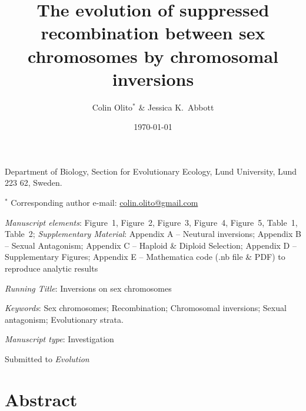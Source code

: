 \documentclass{article}[12pt]
\title{The evolution of suppressed recombination between sex chromosomes by chromosomal inversions}
\author{Colin Olito$^{\ast}$ \& Jessica K.~Abbott}
\date{}
\begin{document}
\maketitle

\noindent{} Department of Biology, Section for Evolutionary Ecology, Lund University, Lund 223 62, Sweden.

\noindent{} $^{\ast}$ Corresponding author e-mail: \url{colin.olito@gmail.com}

\bigskip

\noindent{} \textit{Manuscript elements}: Figure~1, Figure~2, Figure~3, Figure~4, Figure~5, Table~1, Table~2; {\itshape Supplementary Material}: Appendix A -- Neutural inversions; Appendix B -- Sexual Antagonism; Appendix C -- Haploid \& Diploid Selection; Appendix D -- Supplementary Figures; Appendix E -- Mathematica code (.nb file \& PDF) to reproduce analytic results

\bigskip
\noindent{} \textit{Running Title}: Inversions on sex chromosomes

\bigskip

\noindent{} \textit{Keywords}: Sex chromosomes; Recombination; Chromosomal inversions; Sexual antagonism; Evolutionary strata.

\bigskip

\noindent{} \textit{Manuscript type}: Investigation

\bigskip

\begin{center} 
	Submitted to {\itshape Evolution} \date{\today}
\end{center}

\linenumbers
\modulolinenumbers[1]
\renewcommand\linenumberfont{\normalfont\small}


\newpage{}
\section*{Abstract}%
\end{document}
